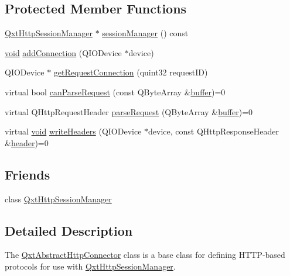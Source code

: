 \subsection*{Protected Member Functions}
\begin{DoxyCompactItemize}
\item 
\hyperlink{class_qxt_http_session_manager}{Qxt\-Http\-Session\-Manager} $\ast$ \hyperlink{class_qxt_abstract_http_connector_a88f33edf3ad21adaf195ecf846d3f5e6}{session\-Manager} () const 
\item 
\hyperlink{group___u_a_v_objects_plugin_ga444cf2ff3f0ecbe028adce838d373f5c}{void} \hyperlink{class_qxt_abstract_http_connector_a0aec454f20271be6c9c087b2e12fbb2c}{add\-Connection} (Q\-I\-O\-Device $\ast$device)
\item 
Q\-I\-O\-Device $\ast$ \hyperlink{class_qxt_abstract_http_connector_ae3a2b3d2fbeefbc86590425de22a679c}{get\-Request\-Connection} (quint32 request\-I\-D)
\item 
virtual bool \hyperlink{class_qxt_abstract_http_connector_a49d287a799d4f07fb78803adc76032c4}{can\-Parse\-Request} (const Q\-Byte\-Array \&\hyperlink{glext_8h_af1b5122dc7bfe0a6319e14419cfe3423}{buffer})=0
\item 
virtual Q\-Http\-Request\-Header \hyperlink{class_qxt_abstract_http_connector_aefaa71fed3832100acf8bbf432968d4f}{parse\-Request} (Q\-Byte\-Array \&\hyperlink{glext_8h_af1b5122dc7bfe0a6319e14419cfe3423}{buffer})=0
\item 
virtual \hyperlink{group___u_a_v_objects_plugin_ga444cf2ff3f0ecbe028adce838d373f5c}{void} \hyperlink{class_qxt_abstract_http_connector_aecd487f983357c571dc287a64cf3422c}{write\-Headers} (Q\-I\-O\-Device $\ast$device, const Q\-Http\-Response\-Header \&\hyperlink{crypt_8h_ae4f2f0852899a81dcd9b8a02e559f0f7}{header})=0
\end{DoxyCompactItemize}
\subsection*{Friends}
\begin{DoxyCompactItemize}
\item 
class \hyperlink{class_qxt_abstract_http_connector_a34cd7cf2d19a70bb3fbba2949c81ebba}{Qxt\-Http\-Session\-Manager}
\end{DoxyCompactItemize}


\subsection{Detailed Description}
The \hyperlink{class_qxt_abstract_http_connector}{Qxt\-Abstract\-Http\-Connector} class is a base class for defining H\-T\-T\-P-\/based protocols for use with \hyperlink{class_qxt_http_session_manager}{Qxt\-Http\-Session\-Manager}. 

